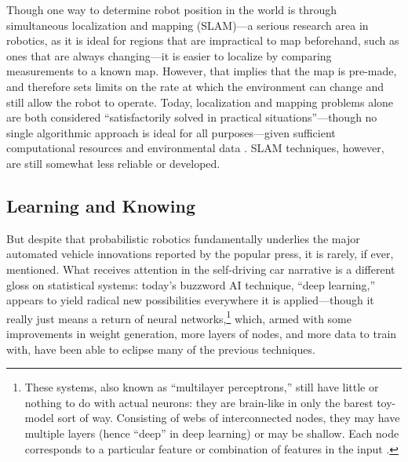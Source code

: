 

Though one way to determine robot position in the world is through
simultaneous localization and mapping (SLAM)---a serious research area in
robotics, as it is ideal for regions that are impractical to map
beforehand, such as ones that are always changing---it is easier to localize by comparing
measurements to a known map. However, that implies that the map is
pre-made, and therefore sets limits on the rate at which the
environment can change and still allow the robot to operate. Today, localization and
mapping problems alone are both considered ``satisfactorily solved in practical
situations''---though no single algorithmic approach is ideal for all purposes---given sufficient
computational resources and environmental data \cite[p.
  5-6]{SLAMbook}. SLAM techniques, however,
are still somewhat less reliable or developed.





\subsection{Learning and Knowing}

But despite that probabilistic robotics fundamentally
underlies the major automated vehicle innovations reported by the
popular press, it is rarely, if ever, mentioned. What receives attention in the
self-driving car narrative is a different gloss on statistical
systems: today's buzzword
AI technique, ``deep learning,'' appears to yield
radical new possibilities everywhere it is 
applied---though it really just means a return of neural
networks,\footnote{These systems, also known as
``multilayer perceptrons,'' still have little or nothing to do
  with actual neurons: they are brain-like in only the barest
  toy-model sort of way. Consisting of webs of interconnected
nodes, they may have multiple layers (hence ``deep'' in deep learning)
or may be shallow. Each node 
corresponds to a particular feature or combination of features in the
input \cite{neuralJordan}.} which, armed with some improvements in weight generation,
more layers of
nodes, and more data to train with, have been able to eclipse many of
the previous techniques. 


